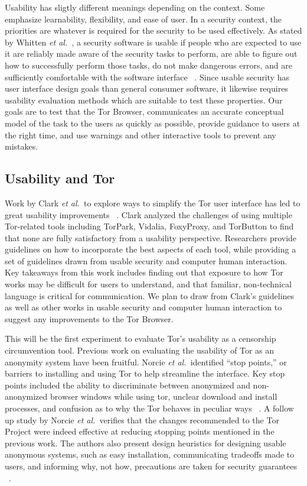 \documentclass[letterpaper,twocolumn,11pt]{article}
\def\etal{{\it et al.~}}
\begin{document}
Usability has sligtly different meanings depending on the context. Some emphasize
learnability, flexibility, and ease of user. In a security context, the priorities are whatever is 
required for the security to be used effectively. As stated by Whitten \etal, a security software is 
usable if people who are expected to use it are reliably made aware of the security tasks to perform, 
are able to figure out how to successfully perform those tasks, do not make dangerous errors, and
are sufficiently comfortable with the software interface ~\cite{whitten1999johnny}. Since usable security 
has user interface design goals than general consumer software, it likewise requires usability evaluation
methods which are suitable to test these properties. Our goals are to test that the Tor Browser, 
communicates an accurate conceptual model of the task to the users as quickly as possible, provide guidance to 
users at the right time, and use warnings and other interactive tools to prevent any mistakes. 

\subsection{Usability and Tor}
\indent \indent  Work by Clark \etal to explore ways to simplify the Tor user interface
has led to great usability improvements ~\cite{clark2007usability}.  Clark analyzed the challenges 
of using multiple Tor-related tools including TorPark, Vidalia, FoxyProxy, and TorButton to find that
none are fully satisfactory from a usability perspective. Researchers provide guidelines on 
how to incorporate the best aspects of each tool, while providing a set of guidelines drawn from
usable security and computer human interaction. Key takeaways from this work includes 
finding out that exposure to how Tor works may be difficult for users to understand, and that 
familiar, non-technical language is critical for communication. We plan to draw from Clark's
guidelines as well as other works in usable security and computer human interaction to suggest
any improvements to the Tor Browser. 

This will be the first experiment to evaluate Tor's usability as a censorship circumvention tool.
Previous work on evaluating the usability of Tor as an anonymity system have been fruitful. 
Norcie \etal identified ``stop points,'' or barriers to installing and using Tor to help streamline
the interface. Key stop points included the ability to discriminate between anonymized and non-
anonymized browser windows while using tor, unclear download and install processes, and 
confusion as to why the Tor behaves in peculiar ways ~\cite{norcie2012eliminating}. A follow up
study by Norcie \etal verifies that the changes recommended to the Tor Project were indeed 
effective at reducing stopping points mentioned in the previous work. The authors also present
design heuristics for designing usable anonymous systems, such as easy installation, communicating
tradeoffs made to users, and informing why, not how, precautions are taken for security guarantees ~\cite{norcie2014johnny}. 
\end{document}
